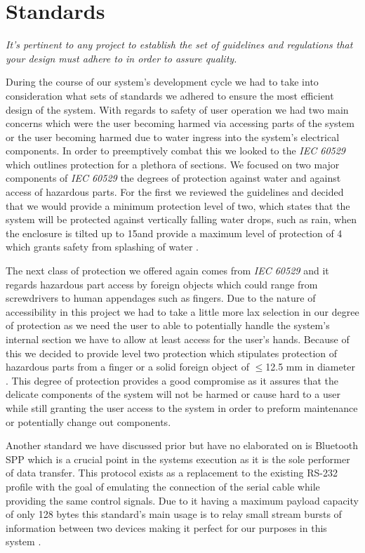 \documentclass[comsoc, 12pt]{IEEEtran}
\begin{document}
\section{Standards}
\begin{center}
    \textit{It's pertinent to any project to establish the set of guidelines and regulations that your design must adhere to in order to assure quality.}
\end{center}
\par During the course of our system's development cycle we had to take into consideration what sets of standards we adhered to ensure the most efficient design of the system. With regards to safety of user operation we had two main concerns which were the user becoming harmed via accessing parts of the system or the user becoming harmed due to water ingress into the system's electrical components. In order to preemptively combat this we looked to the \textit{IEC 60529} which outlines protection for a plethora of sections. We focused on two major components of \textit{IEC 60529} the degrees of protection against water and against access of hazardous parts. For the first we reviewed the guidelines and decided that we would provide a minimum protection level of two, which states that the system will be protected against vertically falling water drops, such as rain, when the enclosure is tilted up to 15\degree and provide a maximum level of protection of 4 which grants safety from splashing of water \cite{WEBSITE:5}. \par The next class of protection we offered again comes from \textit{IEC 60529} and it regards hazardous part access by foreign objects which could range from screwdrivers to human appendages such as fingers. Due to the nature of accessibility in this project we had to take a little more lax selection in our degree of protection as we need the user to able to potentially handle the system's internal section we have to allow at least access for the user's hands. Because of this we decided to provide level two protection which stipulates protection of hazardous parts from a finger or a solid foreign object of $\leq$12.5 mm in diameter \cite{WEBSITE:5}. This degree of protection provides a good compromise as it assures that the delicate components of the system will not be harmed or cause hard to a user while still granting the user access to the system in order to preform maintenance or potentially change out components.   
\par Another standard we have discussed prior but have no elaborated on is Bluetooth SPP which is a crucial point in the systems execution as it is the sole performer of data transfer. This protocol exists as a replacement to the existing RS-232 profile with the goal of emulating the connection of the serial cable while providing the same control signals. Due to it having a maximum payload capacity of only 128 bytes this standard's main usage is to relay small stream bursts of information between two devices making it perfect for our purposes in this system \cite{WEBSITE:6}.
\end{document}
